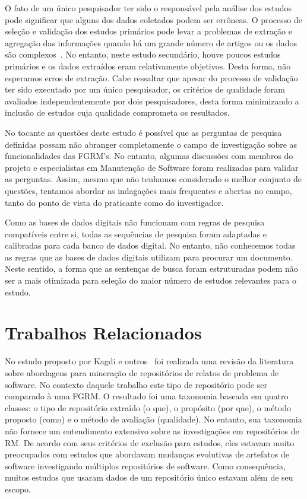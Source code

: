 O fato de um único pesquisador ter sido o responsável pela análise dos estudos
pode significar que alguns dos dados coletados podem ser errôneas. O processo de
seleção e validação dos estudos primários pode levar a problemas de extração e
agregação das informações quando há um grande número de artigos ou os dados são
complexos~\cite{keele2007guidelines}. No entanto, neste estudo secundário, houve
poucos estudos primários e os dados extraídos eram relativamente objetivos.
Desta forma, não esperamos erros de extração. Cabe ressaltar que apesar do
processo de validação ter sido executado por um único pesquisador, os critérios
de qualidade foram avaliados independentemente por dois pesquisadores, desta
forma minimizando a inclusão de estudos cuja qualidade comprometa os resultados.

No tocante as questões deste estudo  é  possível que as perguntas de pesquisa
definidas possam não abranger completamente o campo de investigação sobre as
funcionalidades das FGRM's. No entanto, algumas discussões com membros do
projeto e especialistas em Manutenção de Software foram realizadas para validar
as perguntas. Assim, mesmo que não tenhamos considerado o melhor conjunto de
questões, tentamos abordar as indagações mais frequentes e abertas no campo,
tanto do ponto de vista do praticante como do investigador.

Como as bases de dados digitais não funcionam com regras de pesquisa compatíveis
entre si, todas as sequências de pesquisa foram adaptadas e calibradas para cada
banco de dados digital. No entanto, não conhecemos todas as regras que as bases
de dados digitais utilizam para procurar um documento. Neste sentido, a forma
que as sentenças de busca foram estruturadas podem não ser a mais otimizada para
seleção do maior número de estudos relevantes para o estudo.

\section{Trabalhos Relacionados}
\label{sec:map_trabalhos_relacionados}

No estudo proposto por Kagdi e outros~\cite{kagdi2012assigning} foi realizada
uma revisão da literatura sobre abordagens para mineração de repositórios de
relatos de problema de software. No contexto daquele trabalho este tipo de
repositório pode ser comparado à uma FGRM\@. O resultado foi uma taxonomia
baseada em quatro classes: o tipo de repositório extraído (o que), o propósito
(por que), o método proposto (como) e o método de avaliação (qualidade). No
entanto, sua taxonomia não fornece um entendimento extensivo sobre as
investigações em repositórios de RM. De acordo com seus critérios de exclusão
para estudos, eles estavam muito preocupados com estudos que abordavam mudanças
evolutivas de artefatos de software investigando múltiplos repositórios de
software. Como consequência, muitos estudos que usaram dados de um repositório
único estavam além de seu escopo.

